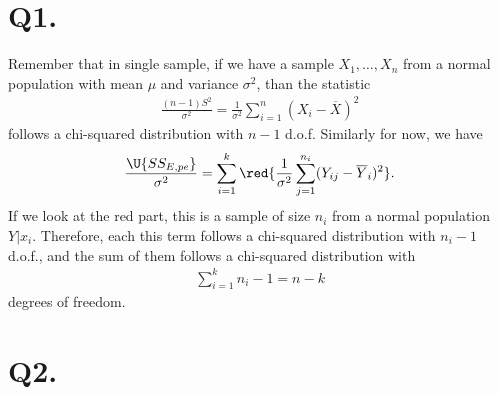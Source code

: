 \section*{Q1.}

Remember that in single sample, if we have a sample $X_1, \ldots, X_n$ from a normal population with mean $\mu$ and variance $\sigma^2$, than the statistic
\begin{align*}
\frac{(n-1)S^2}{\sigma^2} = \frac{1}{\sigma^2} \sum_{i=1}^n (X_i-\overline{X})^2
\end{align*}
follows a chi-squared distribution with $n-1$ d.o.f. Similarly for now, we have
\begin{align*}
\frac{\U{SS_{E,pe}}}{\sigma^2} = \sum_{i=1}^k\red{\frac{1}{\sigma^2}\sum_{j=1}^{n_i}(Y_{ij} - \overline{Y}_i)^2}.
\end{align*}
If we look at the red part, this is a sample of size $n_i$ from a normal population $Y|x_i$. Therefore, each this term follows a chi-squared distribution with $n_i-1$ d.o.f., and the sum of them follows a chi-squared distribution with
\begin{align*}
\sum_{i=1}^k n_i-1 = n - k
\end{align*}
degrees of freedom.

\section*{Q2.}

